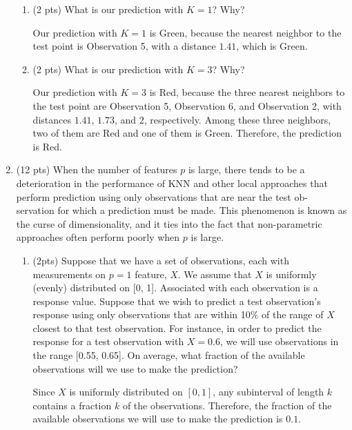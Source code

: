 \documentclass[a4paper]{article}
\theoremstyle{definition}
\newenvironment{soln}{
    \leavevmode\color{blue}\ignorespaces
}{}
\begin{document}
\begin{enumerate}
\begin{enumerate}
	\item (2 pts) What is our prediction with $K=1$? Why?
	
	\begin{soln}
		Our prediction with $K=1$ is Green, because the nearest neighbor to the test point is Observation 5, with a distance $1.41$, which is Green.
		
	\end{soln}
	
	\item (2 pts) What is our prediction with $K=3$? Why?
	
	\begin{soln} 
		Our prediction with $K=3$ is Red, because the three nearest neighbors to the test point are Observation 5, Observation 6, and Observation 2, with distances $1.41$, $1.73$, and $2$, respectively. Among these three neighbors, two of them are Red and one of them is Green. Therefore, the prediction is Red.
	\end{soln}

\end{enumerate}

\item (12 pts) When the number of features $p$ is large, there tends to be a deterioration in the performance of KNN and other local approaches that perform prediction using only observations that are near the test ob- servation for which a prediction must be made. This phenomenon is known as the curse of dimensionality, and it ties into the fact that non-parametric approaches often perform poorly when $p$ is large.

\begin{enumerate}
	\item (2pts) Suppose that we have a set of observations, each with measurements on $p=1$ feature, $X$. We assume that $X$ is uniformly (evenly) distributed on [0, 1]. Associated with each observation is a response value. Suppose that we wish to predict a test observation’s response using only observations that are within 10\% of the range of $X$ closest to that test observation. For instance, in order to predict the response for a test observation with $X=0.6$, we will use observations in the range [0.55, 0.65]. On average, what fraction of the available observations will we use to make the prediction?
	
	\begin{soln} 
		Since $X$ is uniformly distributed on $[0,1]$, any subinterval of length $k$ contains a fraction $k$ of the observations. Therefore, the fraction of the available observations we will use to make the prediction is $0.1$.		 
	\end{soln}
	

\end{enumerate}
\end{enumerate}
\end{document}
